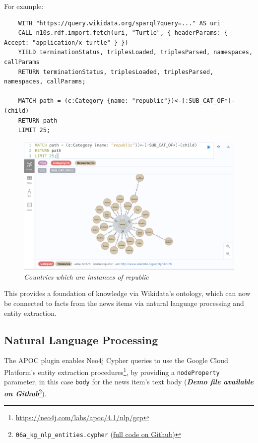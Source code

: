 \documentclass[11pt]{article}
\begin{document}
  For example:
  \begin{lstlisting}
    WITH "https://query.wikidata.org/sparql?query=..." AS uri
    CALL n10s.rdf.import.fetch(uri, "Turtle", { headerParams: { Accept: "application/x-turtle" } })
    YIELD terminationStatus, triplesLoaded, triplesParsed, namespaces, callParams
    RETURN terminationStatus, triplesLoaded, triplesParsed, namespaces, callParams;

    MATCH path = (c:Category {name: "republic"})<-[:SUB_CAT_OF*]-(child)
    RETURN path
    LIMIT 25;
  \end{lstlisting}

  \begin{figure}
    \centerline{\includegraphics[scale=0.5]{category-republic.png}}
    \caption{\textit{Countries which are instances of republic}}
  \end{figure}

  This provides a foundation of knowledge via Wikidata's ontology, which can now be connected to facts from the news items via natural language processing and entity extraction.

  \subsection{Natural Language Processing}

  The APOC plugin enables Neo4j Cypher queries to use the Google Cloud Platform's entity extraction procedures\footnote{\url{https://neo4j.com/labs/apoc/4.1/nlp/gcp}}, by providing a \lstinline{nodeProperty} parameter, in this case \lstinline{body} for the news item's text body (\textit{\textbf{Demo file available on Github}}\footnote{\lstinline{06a_kg_nlp_entities.cypher} (\href{https://github.com/Birkbeck/msc-data-science-project-2020_21---files-heychrisek/}{full code on Github})}).
\end{document}
